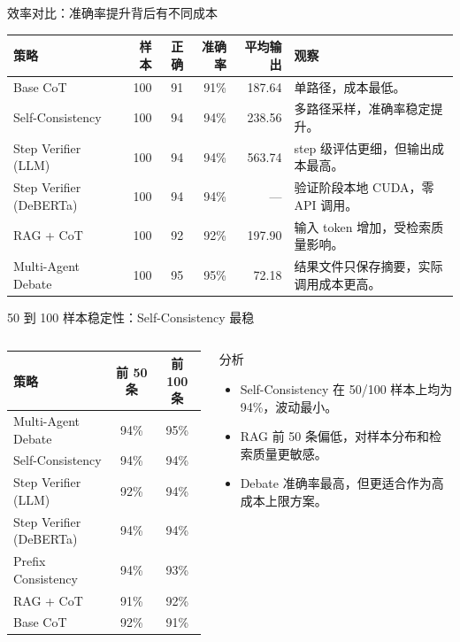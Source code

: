 \documentclass[10pt,aspectratio=169]{beamer}
\newcommand{\tightitems}{\setlength{\itemsep}{0.24em}}
\newcommand{\smallnote}[1]{\vspace{0.25em}{\scriptsize\textcolor{Muted}{#1}}}
\begin{document}
\begin{frame}{效率对比：准确率提升背后有不同成本}
  \small
  \begin{tabularx}{\linewidth}{lrrrrY}
    \toprule
    策略 & 样本 & 正确 & 准确率 & 平均输出 & 观察 \\
    \midrule
    Base CoT & 100 & 91 & 91\% & 187.64 & 单路径，成本最低。 \\
    Self-Consistency & 100 & 94 & 94\% & 238.56 & 多路径采样，准确率稳定提升。 \\
    Step Verifier (LLM) & 100 & 94 & 94\% & 563.74 & step 级评估更细，但输出成本最高。 \\
    Step Verifier (DeBERTa) & 100 & 94 & 94\% & — & 验证阶段本地 CUDA，零 API 调用。 \\
    RAG + CoT & 100 & 92 & 92\% & 197.90 & 输入 token 增加，受检索质量影响。 \\
    Multi-Agent Debate & 100 & 95 & 95\% & 72.18 & 结果文件只保存摘要，实际调用成本更高。 \\
    \bottomrule
  \end{tabularx}
  \smallnote{单位为实验 JSON 记录的平均 output tokens；Debate 的记录低估了真实中间讨论成本。}
\end{frame}

\begin{frame}{50 到 100 样本稳定性：Self-Consistency 最稳}
  \begin{columns}[T,onlytextwidth]
    \begin{column}{0.52\textwidth}
      \small
      \begin{tabular}{lcc}
        \toprule
        策略 & 前 50 条 & 前 100 条 \\
        \midrule
        Multi-Agent Debate & 94\% & 95\% \\
        Self-Consistency & 94\% & 94\% \\
        Step Verifier (LLM) & 92\% & 94\% \\
        Step Verifier (DeBERTa) & 94\% & 94\% \\
        Prefix Consistency & 94\% & 93\% \\
        RAG + CoT & 91\% & 92\% \\
        Base CoT & 92\% & 91\% \\
        \bottomrule
      \end{tabular}
    \end{column}
    \begin{column}{0.44\textwidth}
      \begin{block}{分析}
        \scriptsize
        \begin{itemize}
          \tightitems
          \item Self-Consistency 在 50/100 样本上均为 94\%，波动最小。
          \item RAG 前 50 条偏低，对样本分布和检索质量更敏感。
          \item Debate 准确率最高，但更适合作为高成本上限方案。
        \end{itemize}
      \end{block}
    \end{column}
  \end{columns}
\end{frame}
\end{document}
